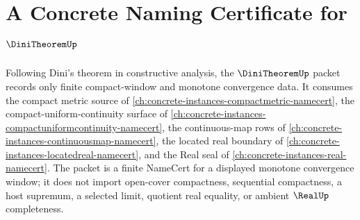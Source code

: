 \chapter{A Concrete Naming Certificate for $\DiniTheoremUp$}
\label{ch:concrete-instances-dini-theorem-namecert}

Following Dini's theorem in constructive analysis, the $\DiniTheoremUp$ packet records only finite compact-window and monotone convergence data. It consumes the compact metric source of \autoref{ch:concrete-instances-compactmetric-namecert}, the compact-uniform-continuity surface of \autoref{ch:concrete-instances-compactuniformcontinuity-namecert}, the continuous-map rows of \autoref{ch:concrete-instances-continuousmap-namecert}, the located real boundary of \autoref{ch:concrete-instances-locatedreal-namecert}, and the Real seal of \autoref{ch:concrete-instances-real-namecert}. The packet is a finite NameCert for a displayed monotone convergence window; it does not import open-cover compactness, sequential compactness, a host supremum, a selected limit, quotient real equality, or ambient $\RealUp$ completeness.

